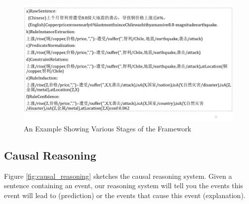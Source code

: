 \begin{figure}[htbp]
	\centering
	\includegraphics[width=0.95\columnwidth]{figures/example}
	\caption{An Example Showing Various Stages of the Framework}
	\label{fig:stages_in_an_example}
\end{figure}

\subsection{Causal Reasoning}
Figure \ref{fig:causal_reasoning} sketches the causal reasoning system.
Given a sentence containing an event, our reasoning system will tell you the events this event will lead to (prediction) or the events that cause this event (explanation). 

